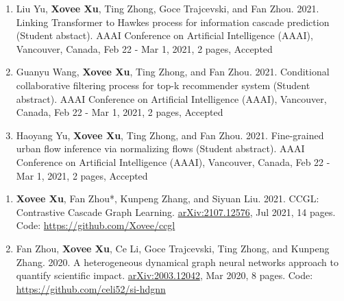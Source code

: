 \begin{enumerate}[resume]
    \item Liu Yu, \textbf{Xovee Xu}, Ting Zhong, Goce Trajcevski, and Fan Zhou. 2021. Linking Transformer to Hawkes process for information cascade prediction (Student abstact). AAAI Conference on Artificial Intelligence (AAAI), Vancouver, Canada, Feb 22 - Mar 1, 2021, 2 pages, Accepted
    \item Guanyu Wang, \textbf{Xovee Xu}, Ting Zhong, and Fan Zhou. 2021. Conditional collaborative filtering process for top-k recommender system (Student abstract). AAAI Conference on Artificial Intelligence (AAAI), Vancouver, Canada, Feb 22 - Mar 1, 2021, 2 pages, Accepted
    \item Haoyang Yu, \textbf{Xovee Xu}, Ting Zhong, and Fan Zhou. 2021. Fine-grained urban flow inference via normalizing flows (Student abstract). AAAI Conference on Artificial Intelligence (AAAI), Vancouver, Canada, Feb 22 - Mar 1, 2021, 2 pages, Accepted
\end{enumerate}


\begin{enumerate}[resume]
    \item \textbf{Xovee Xu}, Fan Zhou*, Kunpeng Zhang, and Siyuan Liu. 2021. CCGL: Contrastive Cascade Graph Learning. \href{https://arxiv.org/abs/2107.12576}{arXiv:2107.12576}, Jul 2021, 14 pages. \newline Code: {\url{https://github.com/Xovee/ccgl}}
    \item Fan Zhou, \textbf{Xovee Xu}, Ce Li, Goce Trajcevski, Ting Zhong, and Kunpeng Zhang. 2020. A heterogeneous dynamical graph neural networks approach to quantify scientific impact. \href{https://arxiv.org/abs/2003.12042}{arXiv:2003.12042}, Mar 2020, 8 pages. \newline Code: {\url{https://github.com/celi52/si-hdgnn}}
\end{enumerate}


